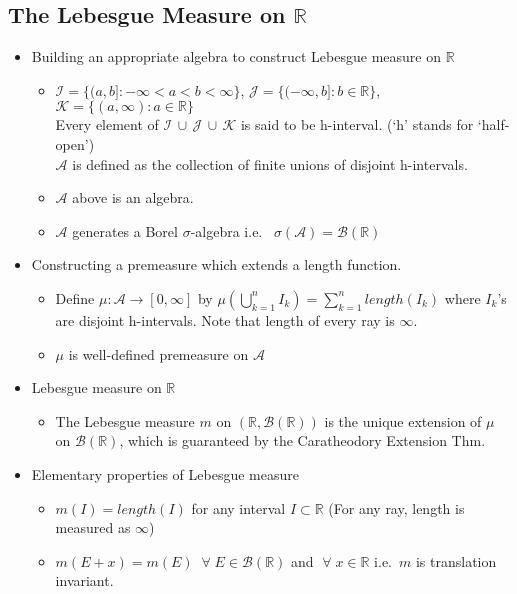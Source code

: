 \documentclass[12pt]{article}
\newcommand{\R}{\mathbb{R}}
\newcommand{\A}{\mathcal{A}}
\newcommand{\Borel}{\mathcal{B}(\mathbb{R})}
\newcommand{\forany}{\; \forall \;}
\newcommand{\union}{\,\cup\,}
\begin{document}
\subsection{The Lebesgue Measure on $\R$}
\smallskip
\begin{itemize}
    \item Building an appropriate algebra to construct Lebesgue measure on $\R$
    \begin{itemize}
        \item $\mathcal{I}=\{(a,b]:-\infty<a<b<\infty\}$,\; $\mathcal{J}=\{(-\infty, b]:b\in \R\}$, \; $\mathcal{K}=\{(a,\infty):a\in \R\}$ \\
        Every element of $\mathcal{I}\union \mathcal{J}\union \mathcal{K}$ is said to be h-interval. \;(`h' stands for `half-open')\\ $\A$ is defined as the collection of finite unions of disjoint h-intervals.
        \item $\A$ above is an algebra.
        \item $\A$ generates a Borel $\sigma$-algebra \; i.e. \, $\sigma(\A)=\Borel$
    \end{itemize}
    \item Constructing a premeasure which extends a length function.
    \begin{itemize}
        \item Define $\mu : \A \rightarrow [0,\infty]$ by $\mu(\bigcup_{k=1}^n I_k)=\sum_{k=1}^n length(I_k)$ where $I_k$'s are disjoint h-intervals. Note that length of every ray is $\infty$. 
        \item $\mu$ is well-defined premeasure on $\A$
    \end{itemize} 
    \item Lebesgue measure on $\R$
    \begin{itemize}
        \item The Lebesgue measure $m$ on $(\R,\Borel)$ is the unique extension of $\mu$ on $\Borel$, which is  guaranteed by the Caratheodory Extension Thm. 
    \end{itemize}
    \item Elementary properties of Lebesgue measure
    \begin{itemize}
        \item $m(I)=length(I)$ for any interval $I\subset \R$ (For any ray, length is measured as $\infty$) 
        \item $m(E+x)=m(E) \;\forany E\in \Borel$ and $\forany x\in \R$ \; i.e.\, $m$ is translation invariant.
    \end{itemize}
\end{itemize}
\smallskip
\end{document}
